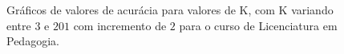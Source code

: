 \begin{figure}[!htb]
  \centering
  \caption{\label{knnKResultsPed} Gráficos de valores de acurácia para valores de K, com K variando entre \(3\) e \(201\) com incremento de \(2\) para o curso de Licenciatura em Pedagogia.}
  \qquad
  \vspace{1.5em}
  \Ididthis
\end{figure}

